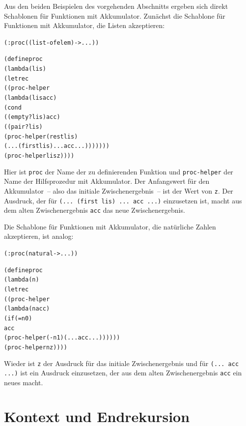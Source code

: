 Aus den beiden Beispielen des vorgehenden Abschnitts ergeben sich
direkt Schablonen für Funktionen mit Akkumulator.  Zunächst die
Schablone für Funktionen mit Akkumulator, die Listen akzeptieren:
%
\begin{alltt}
(: proc ((list-of elem) -> ...))

(define proc
  (lambda (lis)
    (letrec
       ((proc-helper
         (lambda (lis acc)
            (cond
              ((empty? lis) acc)
              ((pair? lis)
                 (proc-helper (rest lis)
                    (... (first lis) ... acc ...)))))))
    (proc-helper lis z))))
\end{alltt}
%
Hier ist \texttt{proc} der Name der zu definierenden Funktion
und \texttt{proc-helper} der Name der Hilfsprozedur mit
Akkumulator.  Der Anfangswert für den Akkumulator~-- also das initiale
Zwischenergebnis~-- ist der Wert von \texttt{z}.  Der
Ausdruck, der für \texttt{(... (first lis) ... acc ...)} einzusetzen
ist, macht aus dem alten Zwischenergebnis \texttt{acc} das neue
Zwischenergebnis.

Die Schablone für Funktionen mit Akkumulator, die natürliche Zahlen
akzeptieren, ist analog:
%
\begin{alltt}
(: proc (natural -> ...))

(define proc
  (lambda (n)
    (letrec
      ((proc-helper
        (lambda (n acc)
          (if (= n 0)
              acc
              (proc-helper (- n 1) (... acc ...))))))
    (proc-helper n z))))
\end{alltt}
%
Wieder ist \texttt{z} der Ausdruck für das initiale Zwischenergebnis
und für \texttt{(... acc ...)} ist ein Ausdruck einzusetzen, der aus
dem alten Zwischenergebnis \texttt{acc} ein neues macht.

\section{Kontext und Endrekursion}
\label{sec:iteration}


